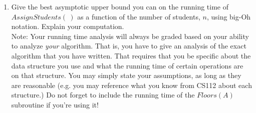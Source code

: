 \documentclass[11pt]{article}
\begin{document}
\begin{enumerate}
\begin{enumerate}
  


    \item Give the best asymptotic upper bound you can on the running time of $AssignStudents(\ )$ as a function of the number of students, $n$, using big-Oh notation. Explain your computation. \\
    
    Note: Your running time analysis will always be graded based on your ability to analyze \emph{your} algorithm. That is, you have to give an analysis of the exact algorithm that you have written. That requires that you be specific about the data structure you use and what the running time of certain operations are on that structure. You may simply state your assumptions, as long as they are reasonable (e.g. you may reference what you know from CS112 about each structure.)
    Do not forget to include the running time of the $Floors(A)$ subroutine if you're using it! 
    
    
   
    
    
    
\end{enumerate}
\end{enumerate}
\end{document}
